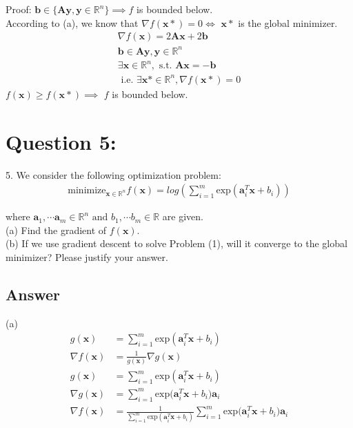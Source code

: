 \documentclass[a4paper,12pt]{article}
\newcommand{\R}{\mathbb{R}}
\begin{document}
Proof: \(\bm{b} \in \{\bm{A}\bm{y}, \bm{y} \in \R^n\}\implies f\) is bounded below.   \\
According to (a), we know that \(\nabla f(\bm{x}*) = 0 \iff\) \(\bm{x}*\) is the global minimizer. \\
\begin{align*}
    \nabla f(\bm{x}) = 2\bm{A}\bm{x} + 2\bm{b}\\ 
    \bm{b} \in \bm{A}\bm{y}, \bm{y} \in \R^n \\
    \exists \bm{x} \in \R^n, \text{ s.t. } \bm{A}\bm{x} = -\bm{b}\\
    \text{ i.e. } \exists \bm{x}* \in \R^n, \text{} \nabla f(\bm{x}*) = 0 
\end{align*} 
\(f(\bm{x}) \geq f(\bm{x}*) \implies\) \(f\) is bounded below.


\section*{Question 5:}
5. We consider the following optimization problem:
\begin{align}
    \text{minimize}_{\bm{x} \in \R^n} f(\bm{x}) = log\left( \sum_{i = 1}^m \text{exp}(\bm{a}_i^T \bm{x} + b_i)\right)
\end{align}

where \(\bm{a}_1, \cdots \bm{a}_m \in \R^n \text{ and } b_1, \cdots b_m \in \R\) are given. \\

(a) Find the gradient of \(f(\bm{x})\). \\
(b) If we use gradient descent to solve Problem (1), will it converge to the global minimizer? Please justify your answer.


\subsection*{Answer}
(a) 
\begin{align*}
    g(\bm{x}) &= \sum_{i=1}^m \text{exp}(\bm{a}_i^T\bm{x} + b_i) \\
    \nabla f(\bm{x}) &= \frac{1}{g(\bm{x})}\nabla g(\bm{x}) \\
    g(\bm{x}) &= \sum_{i = 1}^m \text{exp}(\bm{a}_i^T\bm{x} + b_i) \\
    \nabla g(\bm{x}) &= \sum_{i = 1}^m \text{exp(}\bm{a}_i^T\bm{x} + b_i)\bm{a}_i \\
    \nabla f(\bm{x}) &= \frac{1}{\sum_{i=1}^m \text{exp}(\bm{a}_i^T\bm{x} + b_i)} \sum_{i = 1}^m \text{exp(}\bm{a}_i^T\bm{x} + b_i)\bm{a}_i 
\end{align*}
\end{document}

